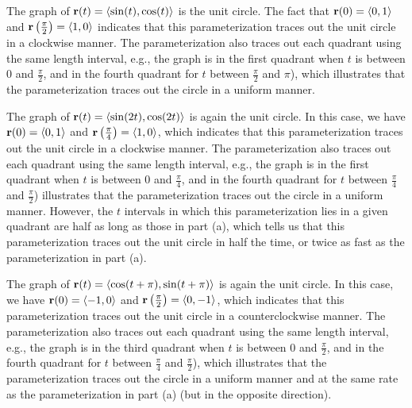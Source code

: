 \begin{activitySolution}
    \ba
    \item The graph of $\mathbf{r}(t) = \langle \sin(t), \cos(t) \rangle$ is the unit circle. The fact that $\mathbf{r}(0) = \langle 0,1 \rangle$ and $\mathbf{r}\left(\frac{\pi}{2}\right) = \langle 1,0 \rangle$ indicates that this parameterization traces out the unit circle in a clockwise manner.  The parameterization also traces out each quadrant using the same length interval, e.g., the graph is in the first quadrant when $t$ is between 0 and $\frac{\pi}{2}$, and in the fourth quadrant for $t$ between $\frac{\pi}{2}$ and $\pi$), which illustrates that the parameterization traces out the circle in a uniform manner.
    \item The graph of $\mathbf{r}(t) = \langle \sin(2t), \cos(2t) \rangle$ is again the unit circle. In this case, we have $\mathbf{r}(0) = \langle 0,1 \rangle$ and $\mathbf{r}\left(\frac{\pi}{4}\right) = \langle 1,0 \rangle$, which indicates that this parameterization traces out the unit circle in a clockwise manner.  The parameterization also traces out each quadrant using the same length interval, e.g., the graph is in the first quadrant when $t$ is between 0 and $\frac{\pi}{4}$, and in the fourth quadrant for $t$ between $\frac{\pi}{4}$ and $\frac{\pi}{2}$) illustrates that the parameterization traces out the circle in a uniform manner. However, the $t$ intervals in which this parameterization lies in a given quadrant are half as long as those in part (a), which tells us that this parameterization traces out the unit circle in half the time, or twice as fast as the parameterization in part (a). 
    \item The graph of $\mathbf{r}(t) = \langle \cos(t+\pi), \sin(t+\pi) \rangle$ is again the unit circle. In this case, we have $\mathbf{r}(0) = \langle -1,0 \rangle$ and $\mathbf{r}\left(\frac{\pi}{2}\right) = \langle 0,-1 \rangle$, which indicates that this parameterization traces out the unit circle in a counterclockwise manner.  The parameterization also traces out each quadrant using the same length interval, e.g., the graph is in the third quadrant when $t$ is between 0 and $\frac{\pi}{2}$, and in the fourth quadrant for $t$ between $\frac{\pi}{4}$ and $\frac{\pi}{2}$), which illustrates that the parameterization traces out the circle in a uniform manner and at the same rate as the parameterization in part (a) (but in the opposite direction). 
    \ea
\end{activitySolution}
\aftera
